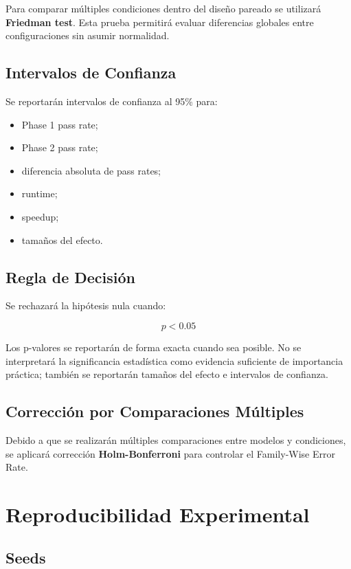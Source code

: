 \documentclass[12pt]{article}
\begin{document}
Para comparar múltiples condiciones dentro del diseño pareado se utilizará \textbf{Friedman test}. Esta prueba permitirá evaluar diferencias globales entre configuraciones sin asumir normalidad.

\subsection{Intervalos de Confianza}

Se reportarán intervalos de confianza al 95\% para:

\begin{itemize}
    \item Phase 1 pass rate;
    \item Phase 2 pass rate;
    \item diferencia absoluta de pass rates;
    \item runtime;
    \item speedup;
    \item tamaños del efecto.
\end{itemize}

\subsection{Regla de Decisión}

Se rechazará la hipótesis nula cuando:

\[
p < 0.05
\]

Los p-valores se reportarán de forma exacta cuando sea posible. No se interpretará la significancia estadística como evidencia suficiente de importancia práctica; también se reportarán tamaños del efecto e intervalos de confianza.

\subsection{Corrección por Comparaciones Múltiples}

Debido a que se realizarán múltiples comparaciones entre modelos y condiciones, se aplicará corrección \textbf{Holm-Bonferroni} para controlar el Family-Wise Error Rate.

\section{Reproducibilidad Experimental}

\subsection{Seeds}
\end{document}
